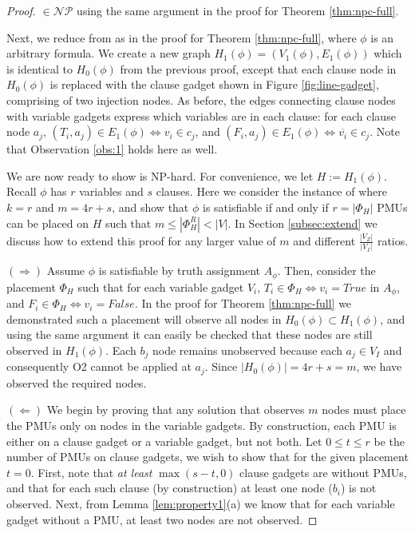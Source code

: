\begin{proof}
\maxinc $\in \mathcal{NP}$ using the same argument in the proof for Theorem \ref{thm:npc-full}.

Next, we reduce from {\sat} as in the proof for Theorem \ref{thm:npc-full}, where $\phi$ is an arbitrary \sat formula. We create a new graph $H_1(\phi) = (V_1(\phi), E_1(\phi))$ which is identical to $H_0(\phi)$ from the previous proof, except that each clause node in $H_0(\phi)$ is replaced with the clause gadget shown in Figure \ref{fig:line-gadget}, comprising of two injection nodes. As before, the edges connecting clause nodes with variable gadgets express which variables are in each clause: for each clause node $a_j$, $(T_i, a_j)\in E_1(\phi) \Leftrightarrow v_i\in c_j$, and $(F_i, a_j)\in E_1(\phi) \Leftrightarrow \overline{v_i}\in c_j$. Note that Observation \ref{obs:1} holds here as well.




We are now ready to show \maxinc is NP-hard. For convenience, we let $H := H_1(\phi)$.  Recall $\phi$ has $r$ variables and $s$ clauses. 
Here we consider the instance of \maxinc where $k=r$ and $m = 4r + s$, and show that $\phi$ is satisfiable if and only if $r=|\Phi_H|$ PMUs
can be placed on $H$ such that $m \leq |\Phi^R_{H}| < |V|$. In Section \ref{subsec:extend} we discuss how to extend this proof for any larger value of $m$ and different $\frac{|V_Z|}{|V_I|}$ ratios.

$(\Rightarrow)$ Assume $\phi$ is satisfiable by truth assignment $A_{\phi}$. Then, consider the placement $\Phi_H$ such that for each variable gadget $V_i$, $T_i\in \Phi_H \Leftrightarrow v_i=True$
in $A_\phi$, and  $F_i\in \Phi_H \Leftrightarrow v_i=False$.  In the proof for Theorem \ref{thm:npc-full} we demonstrated such a placement will observe all nodes in $H_0(\phi)\subset H_1(\phi)$, and using the same argument it can easily be checked that these nodes are still observed in $H_1(\phi)$. Each $b_j$ node remains unobserved because each $a_j \in V_I$ and consequently O2 cannot be applied at $a_j$.
Since $|H_0(\phi)|=4r+s = m$, we have observed the required nodes.

$(\Leftarrow)$
We begin by proving that any solution that observes $m$ nodes must place the PMUs only on nodes in the variable gadgets. By construction, each PMU is either on a clause gadget or a variable gadget, but not both. Let $0\leq t\leq r$ be the number of PMUs on clause gadgets, we wish to show that for the given placement $t=0$. First, note that {\em at least} $\max(s-t,0)$ clause gadgets are without PMUs, and that for each such clause (by construction) at least one node ($b_i$) is not observed. Next, from Lemma \ref{lem:property1}(a) we know that for each variable gadget without a PMU, at least two nodes are not observed.


\end{proof}
